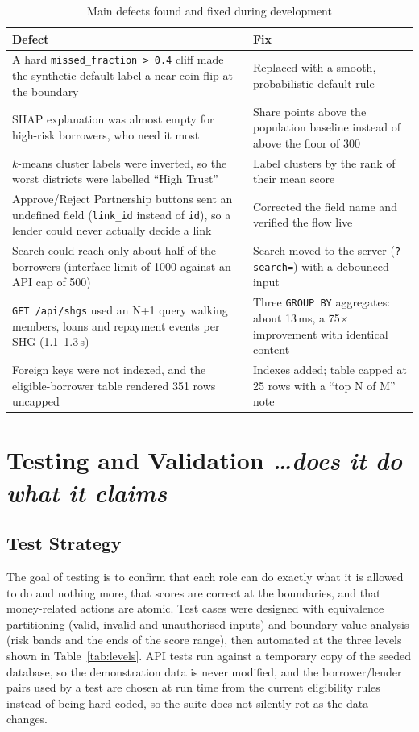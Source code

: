 \documentclass[11pt,a4paper]{article}
\newcommand{\BvrHint}[1]{%
  {\normalfont\normalsize\itshape\hfill #1}}
\newcommand{\code}[1]{\texttt{\small #1}}
\begin{document}
\begin{table}[H]
\centering
\caption{Main defects found and fixed during development}
\label{tab:bugs}
\small
\begin{tabular}{@{}L{7.2cm}L{7.2cm}@{}}
\toprule
\textbf{Defect} & \textbf{Fix}\\
\midrule
A hard \code{missed\_fraction > 0.4} cliff made the synthetic default label a near coin-flip at the boundary & Replaced with a smooth, probabilistic default rule\\
SHAP explanation was almost empty for high-risk borrowers, who need it most & Share points above the population baseline instead of above the floor of 300\\
$k$-means cluster labels were inverted, so the worst districts were labelled ``High Trust'' & Label clusters by the rank of their mean score\\
Approve/Reject Partnership buttons sent an undefined field (\code{link\_id} instead of \code{id}), so a lender could never actually decide a link & Corrected the field name and verified the flow live\\
Search could reach only about half of the borrowers (interface limit of 1000 against an API cap of 500) & Search moved to the server (\code{?search=}) with a debounced input\\
\code{GET /api/shgs} used an N+1 query walking members, loans and repayment events per SHG (1.1--1.3\,s) & Three \code{GROUP BY} aggregates: about 13\,ms, a 75$\times$ improvement with identical content\\
Foreign keys were not indexed, and the eligible-borrower table rendered 351 rows uncapped & Indexes added; table capped at 25 rows with a ``top N of M'' note\\
\bottomrule
\end{tabular}
\end{table}

\section{Testing and Validation%
\BvrHint{\ldots does it do what it claims}}
\label{sec:test}

\subsection{Test Strategy}
The goal of testing is to confirm that each role can do exactly what it is
allowed to do and nothing more, that scores are correct at the boundaries,
and that money-related actions are atomic. Test cases were designed with
equivalence partitioning (valid, invalid and unauthorised inputs) and
boundary value analysis (risk bands and the ends of the score range), then
automated at the three levels shown in Table~\ref{tab:levels}. API tests
run against a temporary copy of the seeded database, so the demonstration
data is never modified, and the borrower/lender pairs used by a test are
chosen at run time from the current eligibility rules instead of being
hard-coded, so the suite does not silently rot as the data changes.
\end{document}
